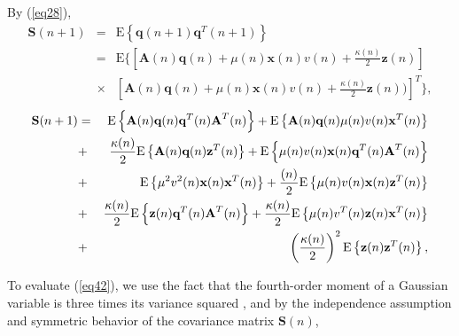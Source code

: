 \noindent By (\ref{eq28}),
\vspace{-0.1cm}
\begin{eqnarray}
\nonumber
\textbf{S}(n+1)&=& \mathrm{E}\left\{\textbf{q}(n+1)\textbf{q}^{T}(n+1)\right\}\\
&=&\mathrm{E}\bigg\{\left[\textbf{A}(n)\textbf{q}(n)+\mu(n)\textbf{x}(n)v(n)+\frac{\kappa(n)}{2} \textbf{z}(n)\right]\\
\nonumber
&\times&\left[\textbf{A}(n)\textbf{q}(n)+\mu(n)\textbf{x}(n)v(n)+\frac{\kappa(n)}{2} \textbf{z}(n))\right]^{T}\bigg\}, \label{eq37}
\end{eqnarray}
\vspace{-1.2cm}
\begin{eqnarray}
\nonumber
\textbf{S}(n+1) &=& \mathrm{E}\left\{\textbf{A}(n)\textbf{q}(n)\textbf{q}^{T}(n)\textbf{A}^{T}(n)\right\} +\mathrm{E}\left\{\textbf{A}(n)\textbf{q}(n)\mu(n)v(n)\textbf{x}^{T}(n)\right\}\\
\nonumber
&+&\frac{\kappa(n)}{2}\mathrm{E}\left\{\textbf{A}(n)\textbf{q}(n)\textbf{z}^{T}(n)\right\}+\mathrm{E}\left\{\mu(n)v(n)\textbf{x}(n)\textbf{q}^{T}(n)\textbf{A}^{T}(n)\right\}\\
\nonumber
&+& \mathrm{E}\left\{\mu^{2}v^{2}(n)\textbf{x}(n)\textbf{x}^{T}(n)\right\}+\frac{(n)}{2}\mathrm{E}\left\{\mu(n)v(n)\textbf{x}(n)\textbf{z}^{T}(n)\right\}\\
\nonumber
&+&\frac{\kappa(n)}{2}\mathrm{E}\left\{\textbf{z}(n)\textbf{q}^{T}(n)\textbf{A}^{T}(n)\right\}+\frac{\kappa(n)}{2}\mathrm{E}\left\{\mu(n)v^{T}(n)\textbf{z}(n)
\textbf{x}^{T}(n)\right\}\\
&+&\left(\frac{\kappa(n)}{2}\right)^{2}\mathrm{E}\left\{\textbf{z}(n)\textbf{z}^{T}(n)\right\}, \label{eq42}\vspace{-0.1cm}
\end{eqnarray}



\noindent To evaluate (\ref{eq42}), we use the fact that the fourth-order moment of a Gaussian variable is three times its variance squared \cite{kennedy}, and by the independence assumption \cite{Haykins} and symmetric behavior of the covariance matrix $\textbf{S}(n)$,


